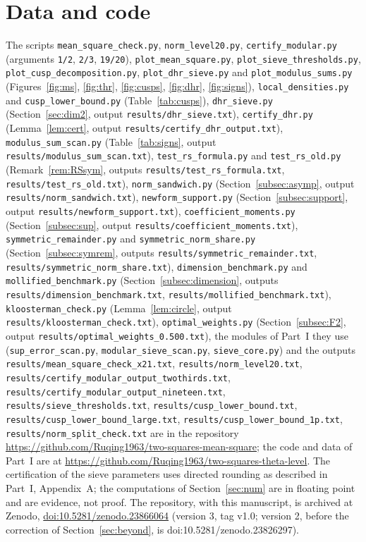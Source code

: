 ﻿\documentclass[11pt]{amsart}
\theoremstyle{remark}
\begin{document}
\section*{Data and code}
{\sloppy
The scripts \texttt{mean\_square\_check.py}, \texttt{norm\_level20.py}, \texttt{certify\_modular.py} (arguments \texttt{1/2}, \texttt{2/3}, \texttt{19/20}), \texttt{plot\_mean\_square.py}, \texttt{plot\_sieve\_thresholds.py}, \texttt{plot\_cusp\_decomposition.py}, \texttt{plot\_dhr\_sieve.py} and \texttt{plot\_modulus\_sums.py} (Figures~\ref{fig:ms}, \ref{fig:thr}, \ref{fig:cusps}, \ref{fig:dhr}, \ref{fig:signs}), \texttt{local\_densities.py} and \texttt{cusp\_lower\_bound.py} (Table~\ref{tab:cusps}), \texttt{dhr\_sieve.py} (Section~\ref{sec:dim2}, output \texttt{results/dhr\_sieve.txt}), \texttt{certify\_dhr.py} (Lemma~\ref{lem:cert}, output \texttt{results/certify\_dhr\_output.txt}), \texttt{modulus\_sum\_scan.py} (Table~\ref{tab:signs}, output \texttt{results/modulus\_sum\_scan.txt}), \texttt{test\_rs\_formula.py} and \texttt{test\_rs\_old.py} (Remark~\ref{rem:RSsym}, outputs \texttt{results/test\_rs\_formula.txt}, \texttt{results/test\_rs\_old.txt}), \texttt{norm\_sandwich.py} (Section~\ref{subsec:asymp}, output \texttt{results/norm\_sandwich.txt}), \texttt{newform\_support.py} (Section~\ref{subsec:support}, output \texttt{results/newform\_support.txt}), \texttt{coefficient\_moments.py} (Section~\ref{subsec:sup}, output \texttt{results/coefficient\_moments.txt}), \texttt{symmetric\_remainder.py} and \texttt{symmetric\_norm\_share.py} (Section~\ref{subsec:symrem}, outputs \texttt{results/symmetric\_remainder.txt}, \texttt{results/symmetric\_norm\_share.txt}), \texttt{dimension\_benchmark.py} and \texttt{mollified\_benchmark.py} (Section~\ref{subsec:dimension}, outputs \texttt{results/dimension\_benchmark.txt}, \texttt{results/mollified\_benchmark.txt}), \texttt{kloosterman\_check.py} (Lemma~\ref{lem:circle}, output \texttt{results/kloosterman\_check.txt}), \texttt{optimal\_weights.py} (Section~\ref{subsec:F2}, output \texttt{results/optimal\_weights\_0.500.txt}), the modules of Part~I they use (\texttt{sup\_error\_scan.py}, \texttt{modular\_sieve\_scan.py}, \texttt{sieve\_core.py}) and the outputs \texttt{results/mean\_square\_check\_x21.txt}, \texttt{results/norm\_level20.txt}, \texttt{results/certify\_modular\_output\_twothirds.txt}, \texttt{results/certify\_modular\_output\_nineteen.txt}, \texttt{results/sieve\_thresholds.txt}, \texttt{results/cusp\_lower\_bound.txt}, \texttt{results/cusp\_lower\_bound\_large.txt}, \texttt{results/cusp\_lower\_bound\_1p.txt}, \texttt{results/norm\_split\_check.txt} are in the repository \url{https://github.com/Ruqing1963/two-squares-mean-square}; the code and data of Part~I are at \url{https://github.com/Ruqing1963/two-squares-theta-level}. The certification of the sieve parameters uses directed rounding as described in Part~I, Appendix~A; the computations of Section~\ref{sec:num} are in floating point and are evidence, not proof. The repository, with this manuscript, is archived at Zenodo, \href{https://doi.org/10.5281/zenodo.23866064}{doi:10.5281/zenodo.23866064} (version 3, tag v1.0; version 2, before the correction of Section~\ref{sec:beyond}, is doi:10.5281/zenodo.23826297).
\par}
\end{document}
